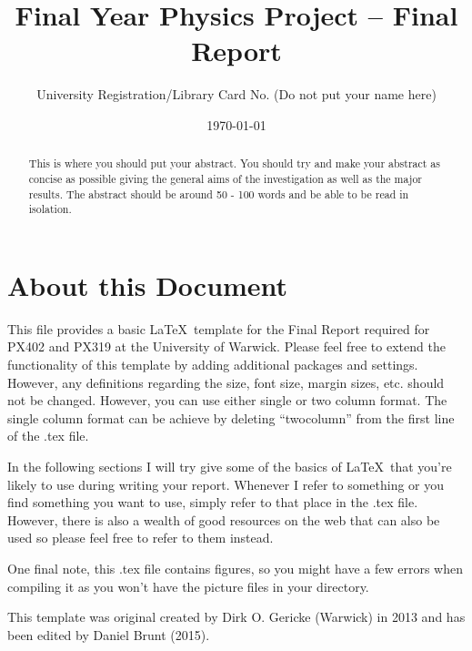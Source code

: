 \documentclass[a4paper, twocolumn, 12pt, notitlepage]{revtex4-1}
\begin{document}
\title{Final Year Physics Project – Final Report}

\author{University Registration/Library Card No. (Do not put your name here)}
\date{\today}



\begin{abstract} 
This is where you should put your abstract. You should try and make your abstract as concise as possible giving the general aims of the investigation as well as the major results. The abstract should be around 50 - 100 words and be able to be read in isolation.  
\end{abstract}


\maketitle

\vspace{-10mm}

\section{About this Document}
This file provides a basic \LaTeX\ template for the Final Report required for PX402 and PX319 at the University of Warwick. Please feel free to extend the functionality of this template by adding additional packages and settings. However, any definitions regarding the size, font size, margin sizes, etc. should not be changed. However, you can use either single or two column format. The single column format can be achieve by deleting ``twocolumn'' from the first line of the .tex file.

In the following sections I will try give some of the basics of \LaTeX\ that you're likely to use during writing your report. Whenever I refer to something or you find something you want to use, simply refer to that place in the .tex file. However, there is also a wealth of good resources on the web that can also be used so please feel free to refer to them instead.

One final note, this .tex file contains figures, so you might have a few errors when compiling it as you won't have the  picture files in your directory.  

This template was original created by Dirk O. Gericke (Warwick) in 2013 and has been edited by Daniel Brunt (2015). 
\end{document}

